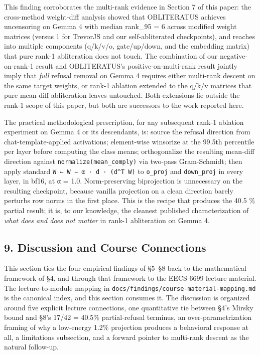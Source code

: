 \documentclass[
  11pt,
]{article}
\begin{document}
This finding corroborates the multi-rank evidence in Section 7 of this
paper: the cross-method weight-diff analysis showed that OBLITERATUS
achieves uncensoring on Gemma 4 with median rank\_95 = 6 across modified
weight matrices (versus 1 for TrevorJS and our self-abliterated
checkpoints), and reaches into multiple components (q/k/v/o,
gate/up/down, and the embedding matrix) that pure rank-1 abliteration
does not touch. The combination of our negative-on-rank-1 result and
OBLITERATUS's positive-on-multi-rank result jointly imply that
\emph{full} refusal removal on Gemma 4 requires either multi-rank
descent on the same target weights, or rank-1 ablation extended to the
q/k/v matrices that pure mean-diff abliteration leaves untouched. Both
extensions lie outside the rank-1 scope of this paper, but both are
successors to the work reported here.

The practical methodological prescription, for any subsequent rank-1
ablation experiment on Gemma 4 or its descendants, is: source the
refusal direction from chat-template-applied activations; element-wise
winsorize at the 99.5th percentile per layer before computing the class
means; orthogonalize the resulting mean-diff direction against
\texttt{normalize(mean\_comply)} via two-pass Gram-Schmidt; then apply
standard \texttt{W\textquotesingle{}\ ←\ W\ −\ α\ ·\ d\ ·\ (d\^{}T\ W)}
to \texttt{o\_proj} and \texttt{down\_proj} in every layer, in bf16, at
α = 1.0. Norm-preserving biprojection is unnecessary on the resulting
checkpoint, because vanilla projection on a clean direction barely
perturbs row norms in the first place. This is the recipe that produces
the 40.5 \% partial result; it is, to our knowledge, the cleanest
published characterization of \emph{what does and does not matter} in
rank-1 abliteration on Gemma 4.

\subsection{9. Discussion and Course
Connections}\label{discussion-and-course-connections}

This section ties the four empirical findings of §5--§8 back to the
mathematical framework of §4, and through that framework to the EECS
6699 lecture material. The lecture-to-module mapping in
\texttt{docs/findings/course-material-mapping.md} is the canonical
index, and this section consumes it. The discussion is organized around
five explicit lecture connections, one quantitative tie between §4's
Mirsky bound and §8's 17/42 = 40.5\% partial-refusal terminus, an
over-parametrization framing of why a low-energy 1.2\% projection
produces a behavioral response at all, a limitations subsection, and a
forward pointer to multi-rank descent as the natural follow-up.
\end{document}
